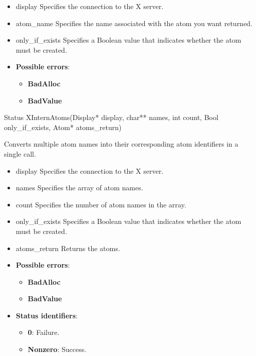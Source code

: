 \documentclass{report}
\begin{document}
\begin{itemize}
            \begin{itemize}
                \item display Specifies the connection to the X server.
                \item atom\_name Specifies the name associated with the atom you want returned.
                \item only\_if\_exists Specifies a Boolean value that indicates whether the atom must be created.
            \end{itemize}

            \begin{itemize}
                \item \textbf{Possible errors}:
                    \begin{itemize}
                        \item \textbf{BadAlloc}
                        \item \textbf{BadValue}
                    \end{itemize}
            \end{itemize}

            \begin{cppcode}
            Status XInternAtoms(Display* display, char** names, int count, Bool only_if_exists, Atom* atoms_return)
            \end{cppcode}
            \bigbreak \noindent
            Converts multiple atom names into their corresponding atom identifiers in a single call.

            \begin{itemize}
                \item display Specifies the connection to the X server.
                \item names Specifies the array of atom names.
                \item count Specifies the number of atom names in the array.
                \item only\_if\_exists Specifies a Boolean value that indicates whether the atom must be created.
                \item atoms\_return Returns the atoms.
            \end{itemize}

            \begin{itemize}
                \item \textbf{Possible errors}:
                    \begin{itemize}
                        \item \textbf{BadAlloc}
                        \item \textbf{BadValue}
                    \end{itemize}
                \item \textbf{Status identifiers}:
                    \begin{itemize}
                        \item \textbf{0}: Failure.
                        \item \textbf{Nonzero}: Success.
                    \end{itemize}
            \end{itemize}


\end{itemize}
\end{document}
